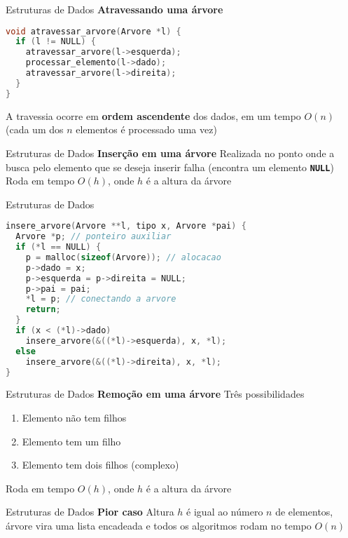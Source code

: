 \documentclass[10pt]{beamer}
\begin{document}
\begin{frame}[fragile]{Estruturas de Dados}
  \huge
  \textbf{Atravessando uma árvore}
  \vfill
  \large
  \begin{lstlisting}[language=C]
void atravessar_arvore(Arvore *l) {
  if (l != NULL) {
    atravessar_arvore(l->esquerda);
    processar_elemento(l->dado);
    atravessar_arvore(l->direita);
  }
}
  \end{lstlisting}
  \vfill
  \large
  A travessia ocorre em \textbf{ordem ascendente} dos dados, em um tempo \textbf{$O(n)$} (cada um dos \textbf{$n$} elementos é processado uma vez)
\end{frame}

\begin{frame}[fragile]{Estruturas de Dados}
  \huge
  \textbf{Inserção em uma árvore}
  \vfill
  \LARGE
  Realizada no ponto onde a busca pelo elemento que se deseja inserir falha (encontra um elemento \texttt{\textbf{NULL}})
  \vfill
  \large
  Roda em tempo \textbf{$O(h)$}, onde \textbf{$h$} é a altura da árvore
\end{frame}

\begin{frame}[fragile]{Estruturas de Dados}
  \vfill
  \begin{lstlisting}[language=C]
insere_arvore(Arvore **l, tipo x, Arvore *pai) {
  Arvore *p; // ponteiro auxiliar
  if (*l == NULL) {
    p = malloc(sizeof(Arvore)); // alocacao
    p->dado = x;
    p->esquerda = p->direita = NULL;
    p->pai = pai;
    *l = p; // conectando a arvore
    return;
  }
  if (x < (*l)->dado)
    insere_arvore(&((*l)->esquerda), x, *l);
  else
    insere_arvore(&((*l)->direita), x, *l);
}
  \end{lstlisting}
\end{frame}

\begin{frame}{Estruturas de Dados}
  \huge
  \textbf{Remoção em uma árvore}
  \vfill
  \LARGE
  Três possibilidades
  \begin{enumerate}
    \item Elemento não tem filhos
    \item Elemento tem um filho
    \item Elemento tem dois filhos (complexo)
  \end{enumerate}
  \vfill
  \large
  Roda em tempo \textbf{$O(h)$}, onde \textbf{$h$} é a altura da árvore
\end{frame}

\begin{frame}{Estruturas de Dados}
  \huge
  \textbf{Pior caso}
  \vfill
  Altura \textbf{$h$} é igual ao número \textbf{$n$} de elementos, árvore vira uma lista encadeada e todos os algoritmos rodam no tempo \textbf{$O(n)$}
\end{frame}
\end{document}

